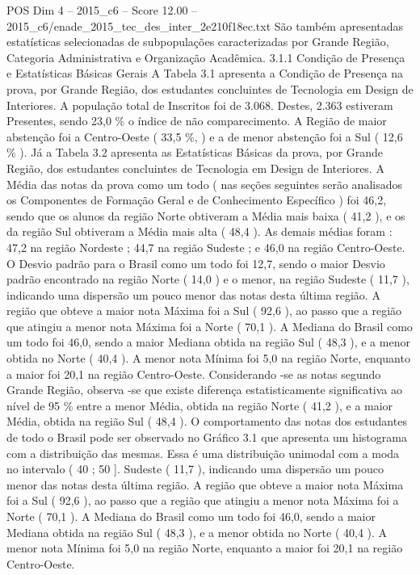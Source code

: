 \begin{textsample}{POS Dim 4 – 2015\_c6 – Score 12.00 – 2015\_c6/enade\_2015\_tec\_des\_inter\_2e210f18ec.txt}
São também apresentadas estatísticas selecionadas de subpopulações caracterizadas por Grande Região, Categoria Administrativa e Organização Acadêmica. 3.1.1 Condição de Presença e Estatísticas Básicas Gerais A Tabela 3.1 apresenta a Condição de Presença na prova, por Grande Região, dos estudantes concluintes de Tecnologia em Design de Interiores.
A população total de Inscritos foi de 3.068.
Destes, 2.363 estiveram Presentes, sendo 23,0 \% o índice de não comparecimento.
A Região de maior abstenção foi a Centro-Oeste ( 33,5 \%, ) e a de menor abstenção foi a Sul ( 12,6 \% ).
Já a Tabela 3.2 apresenta as Estatísticas Básicas da prova, por Grande Região, dos estudantes concluintes de Tecnologia em Design de Interiores.
A Média das notas da prova como um todo ( nas seções seguintes serão analisados os Componentes de Formação Geral e de Conhecimento Específico ) foi 46,2, sendo que os alunos da região Norte obtiveram a Média mais baixa ( 41,2 ), e os da região Sul obtiveram a Média mais alta ( 48,4 ).
As demais médias foram : 47,2 na região Nordeste ; 44,7 na região Sudeste ; e 46,0 na região Centro-Oeste.
O Desvio padrão para o Brasil como um todo foi 12,7, sendo o maior Desvio padrão encontrado na região Norte ( 14,0 ) e o menor, na região Sudeste ( 11,7 ), indicando uma dispersão um pouco menor das notas desta última região.
A região que obteve a maior nota Máxima foi a Sul ( 92,6 ), ao passo que a região que atingiu a menor nota Máxima foi a Norte ( 70,1 ).
A Mediana do Brasil como um todo foi 46,0, sendo a maior Mediana obtida na região Sul ( 48,3 ), e a menor obtida no Norte ( 40,4 ).
A menor nota Mínima foi 5,0 na região Norte, enquanto a maior foi 20,1 na região Centro-Oeste.
Considerando -se as notas segundo Grande Região, observa -se que existe diferença estatisticamente significativa ao nível de 95 \% entre a menor Média, obtida na região Norte ( 41,2 ), e a maior Média, obtida na região Sul ( 48,4 ).
O comportamento das notas dos estudantes de todo o Brasil pode ser observado no Gráfico 3.1 que apresenta um histograma com a distribuição das mesmas.
Essa é uma distribuição unimodal com a moda no intervalo ( 40 ; 50 ].
Sudeste ( 11,7 ), indicando uma dispersão um pouco menor das notas desta última região.
A região que obteve a maior nota Máxima foi a Sul ( 92,6 ), ao passo que a região que atingiu a menor nota Máxima foi a Norte ( 70,1 ).
A Mediana do Brasil como um todo foi 46,0, sendo a maior Mediana obtida na região Sul ( 48,3 ), e a menor obtida no Norte ( 40,4 ).
A menor nota Mínima foi 5,0 na região Norte, enquanto a maior foi 20,1 na região Centro-Oeste.

\end{textsample}
